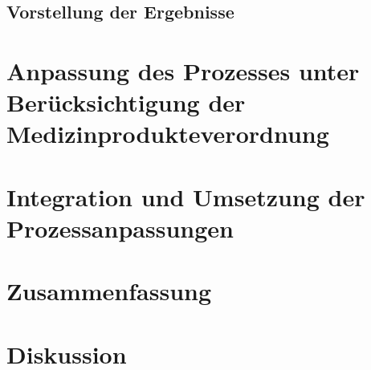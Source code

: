 \documentclass[a4paper,12pt]{report}
\begin{document}
\section{Vorstellung der Ergebnisse}\label{sec:ergebnisse_modellierung}
\chapter{Anpassung des Prozesses unter Berücksichtigung der Medizinprodukteverordnung}\label{chap:AnpassungAnMDR}

\chapter{Integration und Umsetzung der Prozessanpassungen}\label{chap:Integration}

\chapter{Zusammenfassung}\label{chap:Zusammenfassung}

\chapter{Diskussion}\label{chap:Diskussion}

\end{document}
